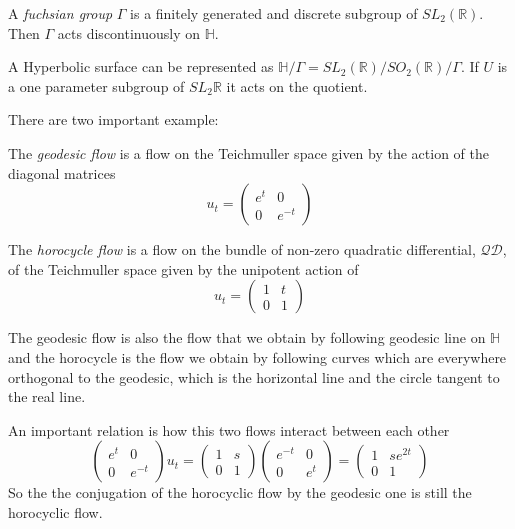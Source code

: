 \begin{dfnt}
A \emph{fuchsian group} $\Gamma$ is a finitely generated and discrete subgroup of $SL_2(\mathbb{R})$. Then $\Gamma$ acts discontinuously on $\mathbb{H}$.
\end{dfnt}

A Hyperbolic surface can be represented as $\mathbb{H}/ \Gamma = SL_2(\mathbb{R}) / SO_2(\mathbb{R}) / \Gamma$. If $U$ is a one parameter subgroup of $SL_2{\mathbb{R}}$ it acts on the quotient.

There are two important example:

\begin{dfnt}
The \emph{geodesic flow} is a flow on the Teichmuller space given by the action of the diagonal matrices\[
u_t=\begin{pmatrix}
e^t & 0 \\
0 & e^{-t}
\end{pmatrix}
\]
\end{dfnt}

\begin{dfnt}
The \emph{horocycle flow} is a flow on the bundle of non-zero quadratic differential, $\mathcal{QD}$, of the Teichmuller space given by the unipotent action of \[
u_t=\begin{pmatrix}
1 & t \\
0 & 1
\end{pmatrix}
\]
\end{dfnt}

The geodesic flow is also the flow that we obtain by following geodesic line on $\mathbb{H}$ and the horocycle is the flow we obtain by following curves which are everywhere orthogonal to the geodesic, which is the horizontal line and the circle tangent to the real line.




An important relation is how this two flows interact between each other \[
\begin{pmatrix} e^t & 0 \\ 0 & e^{-t}\end{pmatrix} u_t=\begin{pmatrix} 1 & s \\ 0 & 1 \end{pmatrix} \begin{pmatrix} e^{-t} & 0 \\ 0 & e^{t}\end{pmatrix}=
\begin{pmatrix} 1 & s e^{2t} \\ 0 & 1\end{pmatrix}
\]
So the the conjugation of the horocyclic flow by the geodesic one is still the horocyclic flow.

